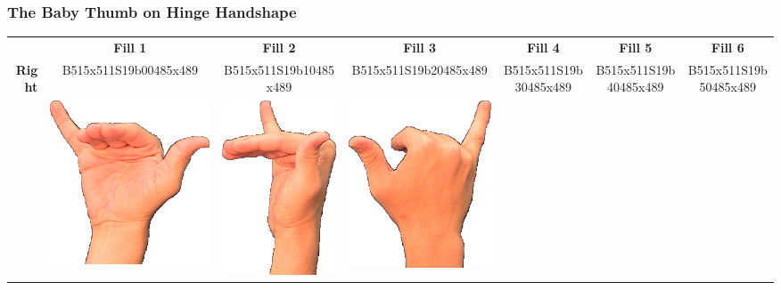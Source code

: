 \documentclass{article}
\begin{document}
\subsubsection{The Baby Thumb on Hinge Handshape}

\begin{center}
\begin{tabular}{r*{6}{c}}
&\textbf{Fill 1}&\textbf{Fill 2}&\textbf{Fill 3}&\textbf{Fill 4}&\textbf{Fill 5}&\textbf{Fill 6}\\
\multirow{2}{*}{\textbf{Right}}&
B515x511S19b00485x489&
B515x511S19b10485x489&
B515x511S19b20485x489&
B515x511S19b30485x489&
B515x511S19b40485x489&
B515x511S19b50485x489\\
&
\includegraphics[scale=0.1]{images/06-08-1.jpg}&
\includegraphics[scale=0.1]{images/06-08-2.jpg}&
\includegraphics[scale=0.1]{images/06-08-3.jpg}&

\end{tabular}
\end{center}
\end{document}
